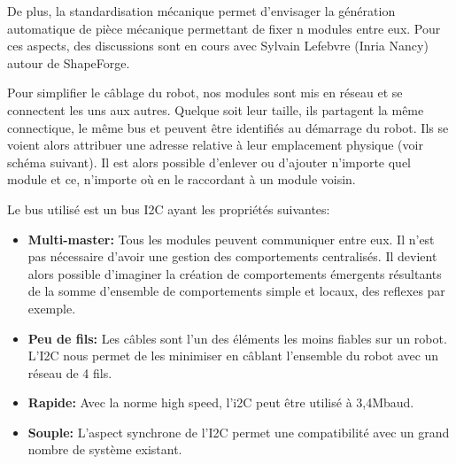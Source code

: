 \documentclass[a0,final, portrait]{inriaposter}
\begin{document}
\begin{multicols}{2}
{De plus, la standardisation mécanique permet d'envisager la génération automatique de pièce mécanique permettant de fixer n modules entre eux. Pour ces aspects, des discussions sont en cours avec Sylvain Lefebvre (Inria Nancy) autour de ShapeForge.
}


 {

Pour simplifier le câblage du robot, nos modules sont mis en réseau et se connectent les uns aux autres. Quelque soit leur taille, ils partagent la même connectique, le même bus et peuvent être identifiés au démarrage du robot. Ils se voient alors attribuer une adresse relative à leur emplacement physique (voir schéma suivant). Il est alors possible d'enlever ou d'ajouter n'importe quel module et ce, n'importe où en le raccordant à un module voisin.

Le bus utilisé est un bus I2C ayant les propriétés suivantes:

\begin{itemize}
    \item \textbf{Multi-master:} Tous les modules peuvent communiquer entre eux. Il n'est pas nécessaire d'avoir une gestion des comportements centralisés. Il devient alors possible d'imaginer la création de comportements émergents résultants de la somme d'ensemble de comportements simple et locaux, des reflexes par exemple.
    \item \textbf{Peu de fils:} Les câbles sont l'un des éléments les moins fiables sur un robot. L'I2C nous permet de les minimiser en câblant l'ensemble du robot avec un réseau de 4 fils.
    \item \textbf{Rapide:} Avec la norme high speed, l'i2C peut être utilisé à 3,4Mbaud.
    \item \textbf{Souple:} L'aspect synchrone de l'I2C permet une compatibilité avec un grand nombre de système existant.
\end{itemize}


}


\end{multicols}
\end{document}
